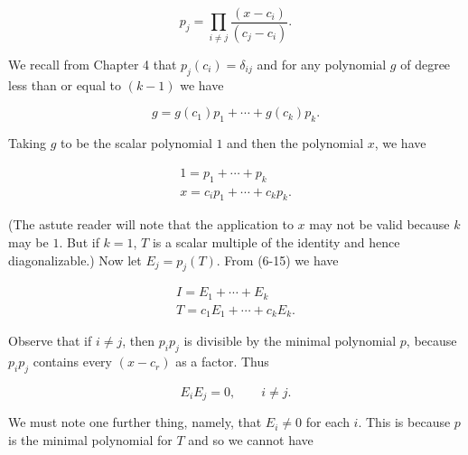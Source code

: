 \[p_{j}=\prod_{i\neq j}\frac{(x-c_{i})}{(c_{j}-c_{i})}.\]

We recall from Chapter 4 that \(p_{j}(c_{i})=\delta_{ij}\) and for any polynomial \(g\) of degree less than or equal to \((k-1)\) we have

\[g=g(c_{1})p_{1}+\cdots+g(c_{k})p_{k}.\]

Taking \(g\) to be the scalar polynomial \(1\) and then the polynomial \(x\), we have

\[\begin{array}{l}1=p_{1}+\cdots+p_{k}\\ x=c_{i}p_{1}+\cdots+c_{k}p_{k}.\end{array}\]

(The astute reader will note that the application to \(x\) may not be valid because \(k\) may be \(1\). But if \(k=1\), \(T\) is a scalar multiple of the identity and hence diagonalizable.) Now let \(E_{j}=p_{j}(T)\). From (6-15) we have

\[\begin{array}{l}I=E_{1}+\cdots+E_{k}\\ T=c_{1}E_{1}+\cdots+c_{k}E_{k}.\end{array}\]

Observe that if \(i\neq j\), then \(p_{i}p_{j}\) is divisible by the minimal polynomial \(p\), because \(p_{i}p_{j}\) contains every \((x-c_{r})\) as a factor. Thus

\[E_{i}E_{j}=0,\qquad i\neq j.\]

We must note one further thing, namely, that \(E_{i}\neq 0\) for each \(i\). This is because \(p\) is the minimal polynomial for \(T\) and so we cannot have 
